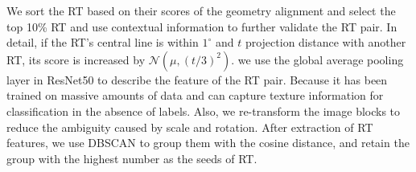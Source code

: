 We sort the RT based on their scores of the geometry alignment and select the top 10\% RT and use contextual information to further validate the RT pair.
In detail,
if the RT's central line is within $1^\circ$ and $t$ projection distance with another RT,
its score is increased by $\mathcal{N}\left(\mu, \left(t/3\right)^2\right)$.
we use the global average pooling layer in ResNet50 to describe the feature of the RT pair.
Because it has been trained on massive amounts of data and can capture texture information for classification in the absence of labels.
Also, 
we re-transform the image blocks to reduce the ambiguity caused by scale and rotation.
After extraction of RT features, 
we use DBSCAN to group them with the cosine distance,
and retain the group with the highest number as the seeds of RT.












